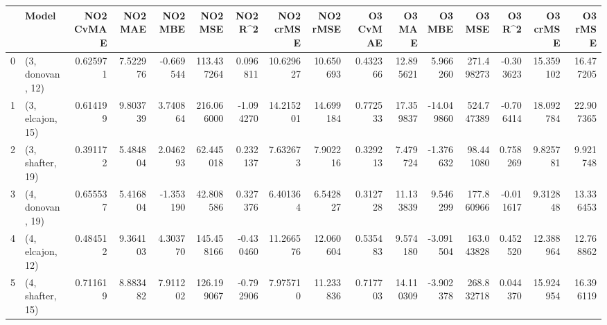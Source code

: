 \begin{tabular}{llrrrrrrrrrrrrrr}
\toprule
{} &             Model &  NO2 CvMAE &   NO2 MAE &   NO2 MBE &     NO2 MSE &   NO2 R\textasciicircum2 &  NO2 crMSE &   NO2 rMSE &  O3 CvMAE &     O3 MAE &     O3 MBE &      O3 MSE &    O3 R\textasciicircum2 &   O3 crMSE &    O3 rMSE \\
\midrule
0 &  (3, donovan, 12) &   0.625971 &  7.522976 & -0.669544 &  113.437264 &  0.096811 &  10.629627 &  10.650693 &  0.432366 &  12.895621 &   5.966260 &  271.498273 & -0.303623 &  15.359102 &  16.477205 \\
1 &  (3, elcajon, 15) &   0.614199 &  9.803739 &  3.740864 &  216.066000 & -1.094270 &  14.215201 &  14.699184 &  0.772533 &  17.359837 & -14.049860 &  524.747389 & -0.706414 &  18.092784 &  22.907365 \\
2 &  (3, shafter, 19) &   0.391172 &  5.484804 &  2.046293 &   62.445018 &  0.232137 &   7.632673 &   7.902216 &  0.329213 &   7.479724 &  -1.376632 &   98.441080 &  0.758269 &   9.825781 &   9.921748 \\
3 &  (4, donovan, 19) &   0.655537 &  5.416804 & -1.353190 &   42.808586 &  0.327376 &   6.401364 &   6.542827 &  0.312728 &  11.133839 &   9.546299 &  177.860966 & -0.011617 &   9.312848 &  13.336453 \\
4 &  (4, elcajon, 12) &   0.484512 &  9.364103 &  4.303770 &  145.458166 & -0.430460 &  11.266576 &  12.060604 &  0.535483 &   9.574180 &  -3.091504 &  163.043828 &  0.452520 &  12.388964 &  12.768862 \\
5 &  (4, shafter, 15) &   0.711619 &  8.883482 &  7.911202 &  126.199067 & -0.792906 &   7.975710 &  11.233836 &  0.717703 &  14.110309 &  -3.902378 &  268.832718 &  0.044370 &  15.924954 &  16.396119 \\
\bottomrule
\end{tabular}
